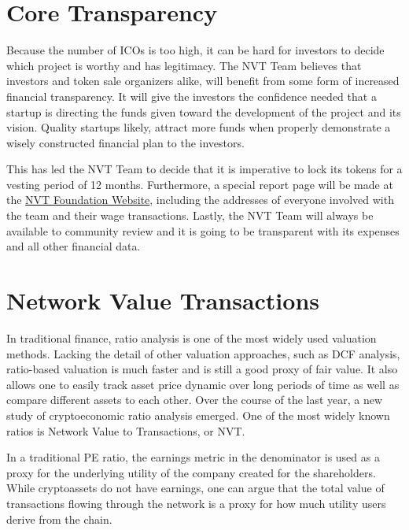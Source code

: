 \section{Core Transparency}

Because the number of ICOs is too high, it can be hard for investors to decide which project is worthy and has legitimacy. The NVT Team believes that investors and token sale organizers alike, will benefit from some form of increased financial transparency. It will give the investors the confidence needed that a startup is directing the funds given toward the development of the project and its vision. Quality startups likely, attract more funds when properly demonstrate a wisely constructed financial plan to the investors.

This has led the NVT Team to decide that it is imperative to lock its tokens for a vesting period of 12 months. Furthermore, a special report page will be made at the \href{https://nvtnetwork.com/}{NVT Foundation Website}, including the addresses of everyone involved with the team and their wage transactions. Lastly, the NVT Team will always be available to community review and it is going to be transparent with its expenses and all other financial data.


\section{Network Value Transactions}

In traditional finance, ratio analysis is one of the most widely used valuation methods. Lacking the detail of other valuation approaches, such as DCF analysis, ratio-based valuation is much faster and is still a good proxy of fair value. It also allows one to easily track asset price dynamic over long periods of time as well as compare different assets to each other. Over the course of the last year, a new study of cryptoeconomic ratio analysis emerged. One of the most widely known ratios is Network Value to Transactions, or NVT.

In a traditional PE ratio, the earnings metric in the denominator is used as a proxy for the underlying utility of the company created for the shareholders. While cryptoassets do not have earnings, one can argue that the total value of transactions flowing through the network is a proxy for how much utility users derive from the chain.


